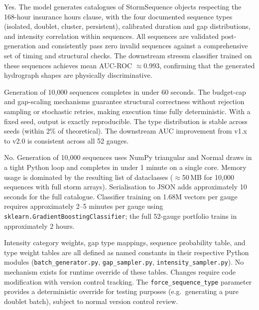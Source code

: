 \documentclass[11pt,a4paper]{article}
\begin{document}
Yes. The model generates catalogues of StormSequence objects respecting the 168-hour insurance hours clause, with the four documented sequence types (isolated, doublet, cluster, persistent), calibrated duration and gap distributions, and intensity correlation within sequences. All sequences are validated post-generation and consistently pass zero invalid sequences against a comprehensive set of timing and structural checks. The downstream stressm classifier trained on these sequences achieves mean AUC-ROC $\approx$0.993, confirming that the generated hydrograph shapes are physically discriminative.

Generation of 10{,}000 sequences completes in under 60 seconds. The budget-cap and gap-scaling mechanisms guarantee structural correctness without rejection sampling or stochastic retries, making execution time fully deterministic. With a fixed seed, output is exactly reproducible. The type distribution is stable across seeds (within 2\% of theoretical). The downstream AUC improvement from v1.x to v2.0 is consistent across all 52 gauges.

No. Generation of 10{,}000 sequences uses NumPy triangular and Normal draws in a tight Python loop and completes in under 1 minute on a single core. Memory usage is dominated by the resulting list of dataclasses ($\approx$50\,MB for 10{,}000 sequences with full storm arrays). Serialisation to JSON adds approximately 10\,seconds for the full catalogue. Classifier training on 1.68M vectors per gauge requires approximately 2--5 minutes per gauge using \texttt{sklearn.GradientBoostingClassifier}; the full 52-gauge portfolio trains in approximately 2 hours.

Intensity category weights, gap type mappings, sequence probability table, and type weight tables are all defined as named constants in their respective Python modules (\texttt{batch\_generator.py}, \texttt{gap\_sampler.py}, \texttt{intensity\_sampler.py}). No mechanism exists for runtime override of these tables. Changes require code modification with version control tracking. The \texttt{force\_sequence\_type} parameter provides a deterministic override for testing purposes (e.g.\ generating a pure doublet batch), subject to normal version control review.
\end{document}
